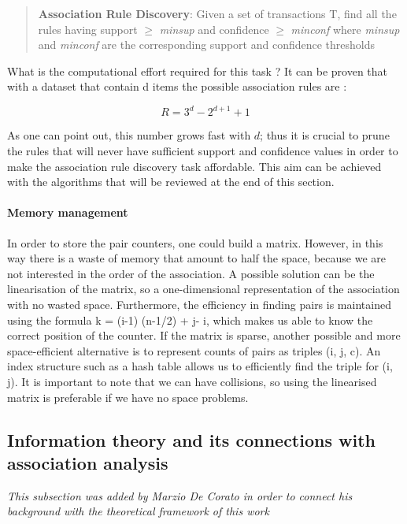 \documentclass[12pt,%
               a4paper,%
               oneside,openany,%
               titlepage,%
               headinclude,footinclude,%
               BCOR5mm,%
               cleardoublepage=empty,%
               tablecaptionabove,%
               floatperchapter,
               ]{scrreprt}                 %
\begin{document}
\begin{quote}
\textbf{Association Rule Discovery}: Given a set of transactions T, find all the rules having support $\ge$ \textit{minsup} and confidence $\ge$ \textit{minconf} where \textit{minsup} and \textit{minconf} are the corresponding support and confidence thresholds
\end{quote}

What is the computational effort required for this task ? It can be proven that with a dataset that contain d items the possible association rules are \cite{tan2019introduction}:

\begin{equation}
R=3^{d}-2^{d+1}+1
\end{equation}

As one can point out, this number grows fast with $d$; thus it is crucial to prune the rules that will never have sufficient support and confidence values in order to make the association rule discovery task affordable. This aim can be achieved with the algorithms that will be reviewed at the end of this section.

\paragraph{Memory management}

In order to store the pair counters, one could build a matrix. However, in this way there is a waste of memory that amount to half the space, because we are not interested in the order of the association.
A possible solution can be the linearisation of the matrix, so a one-dimensional representation of the association with no wasted space. Furthermore, the efficiency in finding pairs is maintained using the formula k = (i-1) (n-1/2) + j- i, which makes us able to know the correct position of the counter.
If the matrix is sparse, another possible and more space-efficient alternative is to represent counts of pairs as triples (i, j, c). An index structure such as a hash table allows us to efficiently find the triple for (i, j). It is important to note that we can have collisions, so using the linearised matrix is preferable if we have no space problems.


\subsection{Information theory and its connections with association analysis}

\textit{This subsection was added by Marzio De Corato in order to connect his background with the theoretical framework of this work} \\
\end{document}
